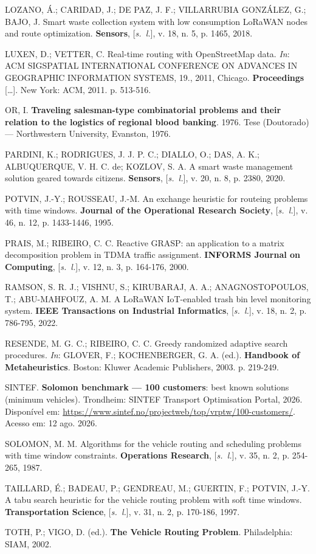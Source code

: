\documentclass[10pt,a4paper]{article}
\newenvironment{referencias}
  {\begin{list}{}{\setlength{\leftmargin}{2.2em}\setlength{\itemsep}{\baselineskip}
     \setlength{\parsep}{0pt}\setlength{\topsep}{4pt}}
   \singlespacing\raggedright\sloppy}
  {\end{list}}
\newcommand{\referencia}{\item[]}
\begin{document}
\begin{referencias}
  \referencia LOZANO, \'A.; CARIDAD, J.; DE PAZ, J. F.; VILLARRUBIA GONZ\'ALEZ, G.; BAJO, J. Smart waste collection system with low consumption LoRaWAN nodes and route optimization. \textbf{Sensors}, [\textit{s.~l.}], v. 18, n. 5, p. 1465, 2018.
  \referencia LUXEN, D.; VETTER, C. Real-time routing with OpenStreetMap data. \textit{In}: ACM SIGSPATIAL INTERNATIONAL CONFERENCE ON ADVANCES IN GEOGRAPHIC INFORMATION SYSTEMS, 19., 2011, Chicago. \textbf{Proceedings} [\ldots]. New York: ACM, 2011. p. 513-516.
  \referencia OR, I. \textbf{Traveling salesman-type combinatorial problems and their relation to the logistics of regional blood banking}. 1976. Tese (Doutorado) --- Northwestern University, Evanston, 1976.
  \referencia PARDINI, K.; RODRIGUES, J. J. P. C.; DIALLO, O.; DAS, A. K.; ALBUQUERQUE, V. H. C. de; KOZLOV, S. A. A smart waste management solution geared towards citizens. \textbf{Sensors}, [\textit{s.~l.}], v. 20, n. 8, p. 2380, 2020.
  \referencia POTVIN, J.-Y.; ROUSSEAU, J.-M. An exchange heuristic for routeing problems with time windows. \textbf{Journal of the Operational Research Society}, [\textit{s.~l.}], v. 46, n. 12, p. 1433-1446, 1995.
  \referencia PRAIS, M.; RIBEIRO, C. C. Reactive GRASP: an application to a matrix decomposition problem in TDMA traffic assignment. \textbf{INFORMS Journal on Computing}, [\textit{s.~l.}], v. 12, n. 3, p. 164-176, 2000.
  \referencia RAMSON, S. R. J.; VISHNU, S.; KIRUBARAJ, A. A.; ANAGNOSTOPOULOS, T.; ABU-MAHFOUZ, A. M. A LoRaWAN IoT-enabled trash bin level monitoring system. \textbf{IEEE Transactions on Industrial Informatics}, [\textit{s.~l.}], v. 18, n. 2, p. 786-795, 2022.
  \referencia RESENDE, M. G. C.; RIBEIRO, C. C. Greedy randomized adaptive search procedures. \textit{In}: GLOVER, F.; KOCHENBERGER, G. A. (ed.). \textbf{Handbook of Metaheuristics}. Boston: Kluwer Academic Publishers, 2003. p. 219-249.
  \referencia SINTEF. \textbf{Solomon benchmark --- 100 customers}: best known solutions (minimum vehicles). Trondheim: SINTEF Transport Optimisation Portal, 2026. Disponível em: \url{https://www.sintef.no/projectweb/top/vrptw/100-customers/}. Acesso em: 12 ago. 2026.
  \referencia SOLOMON, M. M. Algorithms for the vehicle routing and scheduling problems with time window constraints. \textbf{Operations Research}, [\textit{s.~l.}], v. 35, n. 2, p. 254-265, 1987.
  \referencia TAILLARD, \'E.; BADEAU, P.; GENDREAU, M.; GUERTIN, F.; POTVIN, J.-Y. A tabu search heuristic for the vehicle routing problem with soft time windows. \textbf{Transportation Science}, [\textit{s.~l.}], v. 31, n. 2, p. 170-186, 1997.
  \referencia TOTH, P.; VIGO, D. (ed.). \textbf{The Vehicle Routing Problem}. Philadelphia: SIAM, 2002.
\end{referencias}
\end{document}
